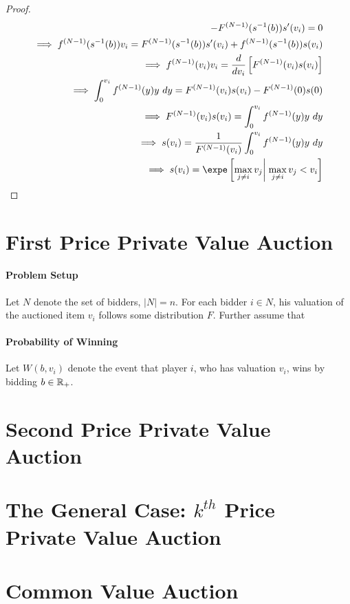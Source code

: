 \documentclass{book}
\begin{document}
\begin{proof}
\begin{align}
			- F^{(N-1)}(s^{-1}(b)) s'(v_i) = 0 \\
			\implies f^{(N-1)}(s^{-1}(b)) v_i = F^{(N-1)}(s^{-1}(b)) s'(v_i) + f^{(N-1)}(s^{-1}(b)) s(v_i) \\
			\implies f^{(N-1)}(v_i) v_i = \frac{d}{dv_i} \left[ F^{(N-1)}(v_i) s(v_i) \right] \\
			\implies \int_{0}^{v_i} f^{(N-1)}(y) y\ dy = F^{(N-1)}(v_i) s(v_i) - F^{(N-1)}(0) s(0) \\
			\implies F^{(N-1)}(v_i) s(v_i) = \int_{0}^{v_i} f^{(N-1)}(y) y\ dy \\
			\implies s(v_i) = \frac{1}{F^{(N-1)}(v_i)} \int_{0}^{v_i} f^{(N-1)}(y) y\ dy \\
			\implies s(v_i) = \expe \left[\max_{j \neq i} v_j \right|\left. \max_{j \neq i} v_j < v_i \right]
		\end{align}
	\end{proof}
	
	\section{First Price Private Value Auction}
	\paragraph{Problem Setup} Let $N$ denote the set of bidders, $|N| = n$. For each bidder $i \in N$, his valuation of the auctioned item $v_i$ follows some distribution $F$. Further assume that 
	\paragraph{Probability of Winning} Let $W(b, v_i)$ denote the event that player $i$, who has valuation $v_i$, wins by bidding $b \in \mathbb{R}_+$.
	
	\section{Second Price Private Value Auction}
	
	\section{The General Case: $k^{th}$ Price Private Value Auction}
	
	\section{Common Value Auction}
	
\end{document}

